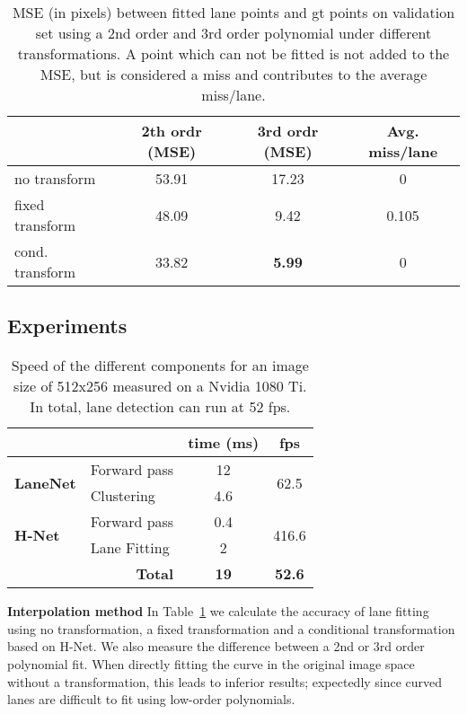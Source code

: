 \documentclass[letterpaper, 10 pt, conference]{ieeeconf}
\begin{document}
\begin{table}
\begin{center}
\begin{tabular}{l|c|c|c}
	& 2th ordr (MSE) & 3rd ordr (MSE)& Avg. miss/lane \\
    \hline
    no transform & 53.91 & 17.23 & 0 \\
    fixed transform & 48.09 & 9.42 & 0.105 \\
    cond. transform & 33.82 & \textbf{5.99} & 0 \\
\end{tabular}
\end{center}
\caption{MSE (in pixels) between fitted lane points and gt points on validation set using a 2nd order and 3rd order polynomial under different transformations. A point which can not be fitted is not added to the MSE, but is considered a miss and contributes to the average miss/lane. }
\label{tab:hnet_performance}
\end{table}


\subsection{Experiments}

\begin{table}
\begin{center}
\begin{tabular}{ll|c|c}
           							& & time (ms) 	& fps 	\\ \hline
\multirow{2}{*}{\textbf{LaneNet}}				& Forward pass 		& 12        	& \multirow{2}{*}{62.5}  \\
                       							& Clustering   		& 4.6        	&     	\\ \hline
\multirow{2}{*}{\textbf{H-Net}}         		& Forward pass 		& 0.4        	& \multirow{2}{*}{416.6}   	\\ 
             									& Lane Fitting 		& 2      		&     	\\ \hline
                    							& \multicolumn{1}{r|}{\textbf{Total}}   & \textbf{19}	& \textbf{52.6}  \\     
\end{tabular}    
\end{center}
\caption{Speed of the different components for an image size of 512x256 measured on a Nvidia 1080 Ti. In total, lane detection can run at 52 fps.}
\label{tab:speed}
\end{table}

\textbf{Interpolation method} In Table~\ref{tab:hnet_performance} we calculate the accuracy of lane fitting using no transformation, a fixed transformation and a conditional transformation based on H-Net. We also measure the difference between a 2nd or 3rd order polynomial fit. When directly fitting the curve in the original image space without a transformation, this leads to inferior results; expectedly since curved lanes are difficult to fit using low-order polynomials. 
\end{document}
